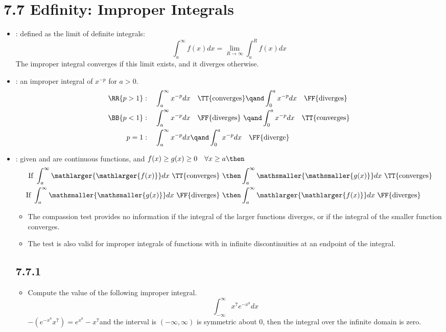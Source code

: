 \section{7.7 Edfinity: Improper Integrals}
\begin{itemize}
  \item {}: defined as the limit of definite integrals:
  \[%
  \int_{a}^{\infty} f (x) dx = \lim_{R \to \infty}  \int_{a}^{R}  f (x) dx
  \]%
  The improper integral converges if this limit exists, and it diverges
  otherwise.
  \item {}: an improper integral of \(x^{-p}\) for \(a > 0\).
  \begin{align*}
    \RR{p > 1} &: \quad \int_{a}^{\infty} x^{-p} dx \quad \text{\TT{converges}} \qand \int_{0}^{a} x^{-p}dx \quad \text{\FF{diverges}}\\
    \BB{p < 1} &: \quad \int_{a}^{\infty} x^{-p} dx \quad \text{\FF{diverges}}~ \qand \int_{0}^{a} x^{-p}dx \quad \text{\TT{converges}}\\
    p = 1 &: \quad \int_{a}^{\infty} x^{-p} dx  \qand \int_{0}^{a} x^{-p}dx \quad \text{\FF{diverge}}
  \end{align*}
  \item {}: given  and  are
    continuous functions, and \(f (x) \geq g (x) \geq 0 \quad\forall x \geq a \then\)
    \begin{align*}
      \text{If}~\int_{a}^{\infty} \mathlarger{\mathlarger{f (x)}} dx ~\text{\TT{converges}}~&\then
      \int_{a}^{\infty} \mathsmaller{\mathsmaller{g (x)}} dx ~\text{\TT{converges}}\\
      \text{If}~\int_{a}^{\infty} \mathsmaller{\mathsmaller{g (x)}} dx ~\text{\FF{diverges}}~&\then
      \int_{a}^{\infty} \mathlarger{\mathlarger{f (x)}} dx ~\text{\FF{diverges}}
    \end{align*}
    \begin{itemize}
      \item The compassion test provides no information if the integral of the
        larger functions diverges, or if the integral of the smaller function
        converges.
      \item The test is also valid for improper integrals of functions with in
        infinite discontinuities at an endpoint of the integral.
    \end{itemize}

    \subsection{7.7.1}
    \begin{itemize}
      \item Compute the value of the following improper integral.
        \[%
        \int_{-\infty}^{\infty} x^7 e^{-x^8} dx
        \]%
        \(-(e^{-x^8}x^7) = e^{x^8}-x^7\)and the interval is \((-\infty,
        \infty)\) is symmetric about 0, then the integral over the infinite
        domain is zero.
    \end{itemize}


\end{itemize}
